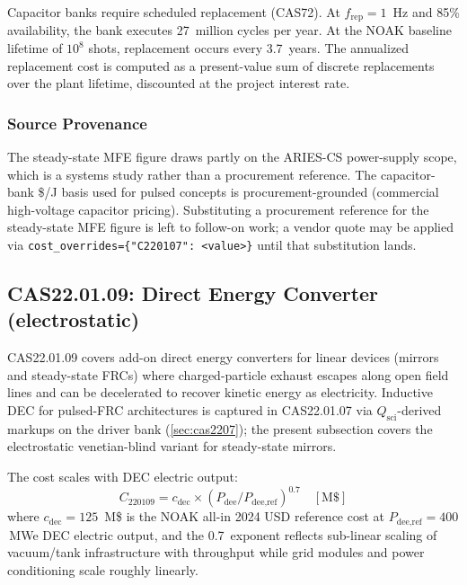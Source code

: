 \documentclass{article}
\begin{document}
Capacitor banks require scheduled replacement (CAS72).  At $f_{\text{rep}}
= 1$~Hz and 85\% availability, the bank executes 27~million cycles per
year.  At the NOAK baseline lifetime of $10^8$ shots, replacement occurs
every 3.7~years.  The annualized replacement cost is computed as a
present-value sum of discrete replacements over the plant lifetime,
discounted at the project interest rate.

\subsubsection{Source Provenance}
The steady-state MFE figure draws partly on the ARIES-CS
\citep{najmabadi2008stellarator} power-supply scope, which is a
systems study rather than a procurement reference. The capacitor-bank
\$/J basis used for pulsed concepts is procurement-grounded
(commercial high-voltage capacitor pricing). Substituting a
procurement reference for the steady-state MFE figure is left to
follow-on work; a vendor quote may be applied via
\texttt{cost\_overrides=\{"C220107": <value>\}} until that
substitution lands.

\subsection{CAS22.01.09: Direct Energy Converter (electrostatic)}
\label{sec:cas2209}

CAS22.01.09 covers add-on direct energy converters for linear devices
(mirrors and steady-state FRCs) where charged-particle exhaust escapes
along open field lines and can be decelerated to recover kinetic energy
as electricity.  Inductive DEC for pulsed-FRC architectures is captured in
CAS22.01.07 via $Q_{\text{sci}}$-derived markups on the driver bank
(\cref{sec:cas2207}); the present subsection covers the electrostatic
venetian-blind variant for steady-state mirrors.

The cost scales with DEC electric output:
\begin{equation}
  C_{220109} = c_{\text{dec}} \times (P_{\text{dee}} / P_{\text{dee,ref}})^{0.7}
  \quad [\text{M\$}]
\end{equation}
where $c_{\text{dec}} = 125$~M\$ is the NOAK all-in 2024 USD reference
cost at $P_{\text{dee,ref}} = 400$\,MWe DEC electric output, and the
0.7~exponent reflects sub-linear scaling of vacuum/tank infrastructure
with throughput while grid modules and power conditioning scale roughly
linearly.
\end{document}
